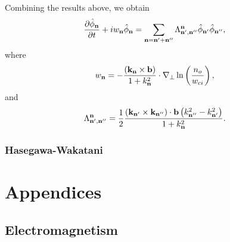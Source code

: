 \documentclass[oneside,a4paper,11pt]{report}
\begin{document}
Combining the results above, we obtain
\begin{equation}
    \frac{\partial \hat{\phi}_{\mathbf{n}}}{\partial t} + i w_{\mathbf{n}} \hat{\phi}_{\mathbf{n}} = \sum_{\mathbf{n} = \mathbf{n}' + \mathbf{n}''} \Lambda^{\mathbf{n}}_{\mathbf{n}', \mathbf{n}''} \hat{\phi}_{\mathbf{n}'} \hat{\phi}_{\mathbf{n}''},
\end{equation}
where
\begin{equation}
    w_{\mathbf{n}} = - \frac{ \left (\mathbf{k}_{\mathbf{n}} \times \mathbf{b} \right ) }{1 + k^2_{\mathbf{n}}} \cdot \nabla_\perp \ln \left ( \frac{n_o}{w_{ci}} \right ),
\end{equation}
and
\begin{equation}
    \Lambda^{\mathbf{n}}_{\mathbf{n}', \mathbf{n}''} = \frac{1}{2} \frac{  \left ( \mathbf{k}_{\mathbf{n}'} \times \mathbf{k}_{\mathbf{n}''} \right ) \cdot \mathbf{b} \left ( k^2_{\mathbf{n}''} - k^2_{\mathbf{n}'} \right ) }{1 + k^2_{\mathbf{n}}}.
\end{equation}

\section{Hasegawa-Wakatani}

%
%
\part{Appendices}
%
%
\appendix

\chapter{Electromagnetism}

\end{document}
